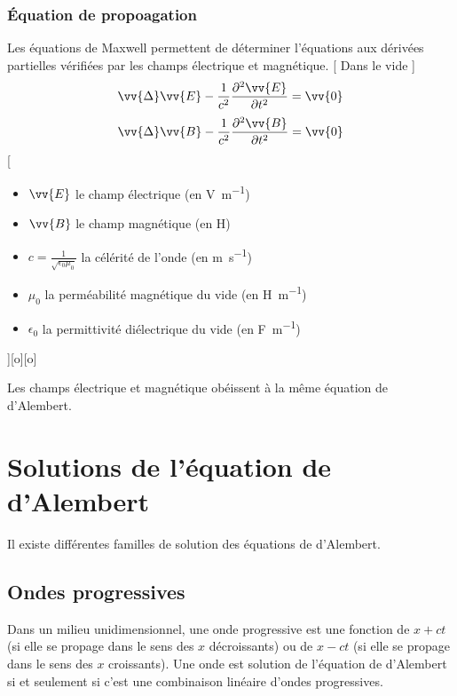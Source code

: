 \subsubsection{Équation de propoagation}
Les équations de Maxwell permettent de déterminer l'équations aux dérivées partielles vérifiées par les champs électrique et magnétique.
[
    Dans le vide
]
{
    $$\vv{\Delta}\vv{E}-\frac{1}{c^2}\frac{\partial^2 \vv{E}}{\partial t^2}=\vv{0}$$
    $$\vv{\Delta}\vv{B}-\frac{1}{c^2}\frac{\partial^2 \vv{B}}{\partial t^2}=\vv{0}$$
}
[
    \begin{itemize}
        \item $\vv{E}$ le champ électrique (en \unit{V.m^{-1}})
        \item $\vv{B}$ le champ magnétique (en \unit{H})
        \item $c=\frac{1}{\sqrt{\epsilon_0\mu_0}}$ la célérité de l'onde (en \unit{m.s^{-1}})
        \item $\mu_0$ la perméabilité magnétique du vide (en \unit{H.m^{-1}})
        \item $\epsilon_0$ la permittivité diélectrique du vide (en \unit{F.m^{-1}})
    \end{itemize}
][o][o]

Les champs électrique et magnétique obéissent à la même équation de d'Alembert.


\section{Solutions de l'équation de d'Alembert}
Il existe différentes familles de solution des équations de d'Alembert.
\subsection{Ondes progressives}
Dans un milieu unidimensionnel, une onde progressive est une fonction de $x+ct$ (si elle se propage dans le sens des $x$ décroissants) ou de $x-ct$ (si elle se propage dans le sens des $x$ croissants).
Une onde est solution de l'équation de d'Alembert si et seulement si c'est une combinaison linéaire d'ondes progressives.

